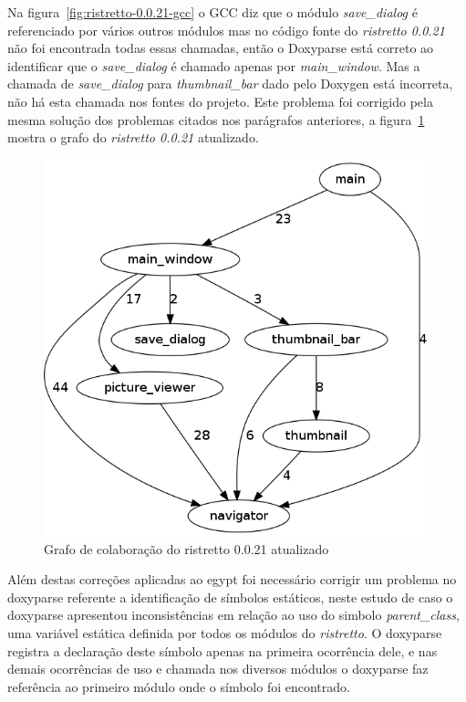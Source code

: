 Na figura~\ref{fig:ristretto-0.0.21-gcc} o GCC diz que o módulo {\it
save\_dialog} é referenciado por vários outros módulos mas no código fonte do
{\it ristretto 0.0.21} não foi encontrada todas essas chamadas, então o
Doxyparse está correto ao identificar que o {\it save\_dialog} é chamado apenas
por {\it main\_window}. Mas a chamada de {\it save\_dialog} para {\it
thumbnail\_bar} dado pelo Doxygen está incorreta, não há esta chamada nos
fontes do projeto. Este problema foi corrigido pela mesma solução dos problemas
citados nos parágrafos anteriores, a figura~\ref{fig:ristretto-0.0.21-doxyparse-2}
mostra o grafo do {\it ristretto 0.0.21} atualizado.

\begin{figure}
\center
\includegraphics[scale=0.4]{imagens/ristretto-0_0_21-doxyparse-2}
\caption{Grafo de colaboração do ristretto 0.0.21 atualizado}
\label{fig:ristretto-0.0.21-doxyparse-2}
\end{figure}

Além destas correções aplicadas ao egypt foi necessário corrigir um problema no
doxyparse referente a identificação de símbolos estáticos, neste estudo de caso
o doxyparse apresentou inconsistências em relação ao uso do simbolo
{\it parent\_class}, uma variável estática definida por todos os módulos do {\it
ristretto}. O doxyparse registra a declaração deste símbolo apenas na primeira
ocorrência dele, e nas demais ocorrências de uso e chamada nos diversos módulos o
doxyparse faz referência ao primeiro módulo onde o símbolo foi encontrado.

